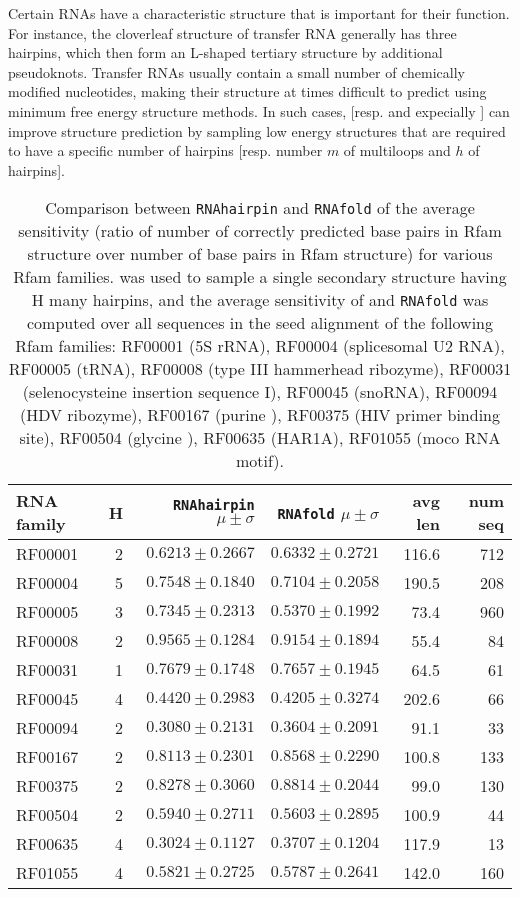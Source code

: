 Certain RNAs have a characteristic structure that is important for
their function. For instance, the cloverleaf structure of transfer RNA
generally has three hairpins,  which then form an L-shaped tertiary
structure by additional pseudoknots. Transfer RNAs usually contain
a small number of chemically modified nucleotides, making their structure
at times difficult to predict using minimum free energy structure methods.
In such cases, {\rnahairpin} [resp. and expecially {\rnahairpinml}]
can improve structure prediction by
sampling low energy structures that are required to have a specific
number of hairpins [resp. number $m$ of multiloops and $h$ of hairpins].

\begin{table*}[!t]
\begin{tabular}{|l|rrrrr|}
\hline
RNA family & H & {\tt RNAhairpin} $\mu \pm \sigma$ & {\tt RNAfold}
$\mu \pm \sigma$ & avg len & num seq\\
\hline
RF00001 & 2 & $0.6213 \pm 0.2667$ & $0.6332 \pm 0.2721$ & 116.6 & 712\\
RF00004 & 5 & $0.7548 \pm 0.1840$ & $0.7104 \pm 0.2058$ & 190.5 & 208 \\
RF00005 & 3 & $0.7345 \pm 0.2313$ & $0.5370 \pm 0.1992$ & 73.4 &960  \\
RF00008 & 2 & $0.9565 \pm 0.1284$ & $0.9154 \pm 0.1894$ & 55.4 & 84\\
RF00031 & 1 & $0.7679 \pm 0.1748$ & $0.7657 \pm 0.1945$ & 64.5 & 61\\
RF00045 & 4 & $0.4420 \pm 0.2983$ & $0.4205 \pm 0.3274$ & 202.6 & 66 \\
RF00094 & 2 & $0.3080 \pm 0.2131$ & $0.3604 \pm 0.2091$ & 91.1 & 33\\
RF00167 & 2 & $0.8113 \pm 0.2301$ & $0.8568 \pm 0.2290$ & 100.8 & 133 \\
RF00375 & 2 & $0.8278 \pm 0.3060$ & $0.8814 \pm 0.2044$ & 99.0 & 130\\
RF00504 & 2 & $0.5940 \pm 0.2711$ & $0.5603 \pm 0.2895$ & 100.9 & 44\\
RF00635 & 4 & $0.3024 \pm 0.1127$ & $0.3707 \pm 0.1204$ & 117.9 & 13\\
RF01055 & 4 & $0.5821 \pm 0.2725$ & $0.5787 \pm 0.2641$ & 142.0 & 160 \\
\hline
\end{tabular}
\caption{Comparison between {\tt RNAhairpin} and {\tt RNAfold}
of the average sensitivity (ratio of
number of correctly predicted base pairs in Rfam structure over
number of base pairs in Rfam structure) for various Rfam families.
{\rnahairpin}
was used to sample a single secondary structure having H many hairpins,
and the average sensitivity of {\rnahairpin} and {\tt RNAfold}
was computed over all sequences in the seed alignment of the following
Rfam families:
RF00001 (5S rRNA),
RF00004 (splicesomal U2 RNA),
RF00005 (tRNA),
RF00008 (type III hammerhead ribozyme),
RF00031 (selenocysteine insertion sequence I),
RF00045 (snoRNA),
RF00094 (HDV ribozyme),
RF00167 (purine \rb),
RF00375 (HIV primer binding site),
RF00504 (glycine \rb),
RF00635 (HAR1A),
RF01055 (moco RNA motif).
}
\label{table:sensitivity}
\end{table*}


